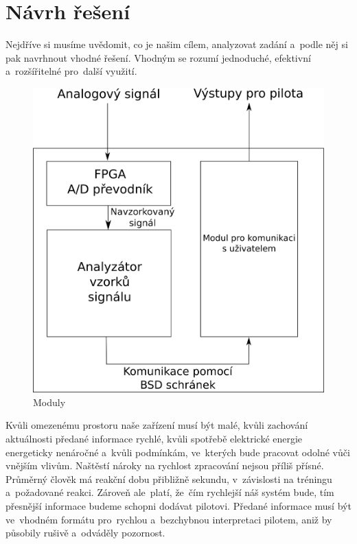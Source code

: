 \chapter{Návrh řešení}\label{navrhReseni}
	Nejdříve si musíme uvědomit, co je našim cílem, analyzovat zadání a~podle něj si pak navrhnout vhodné řešení. Vhodným se rozumí jednoduché, efektivní a~rozšířitelné pro~další využití.\par
	
	\begin{figure}[H]
		\begin{center}
			\includegraphics[scale=0.7]{obrazky-figures/navrh_obecne.png}
			\caption{Moduly}
			\label{navrh::moduly}
		\end{center}
	\end{figure}
	
	Kvůli omezenému prostoru naše zařízení musí být malé, kvůli zachování aktuálnosti předané informace rychlé, kvůli spotřebě elektrické energie energeticky nenáročné a~kvůli podmínkám, ve~kterých bude pracovat odolné vůči vnějším vlivům. Naštěstí nároky na rychlost zpracování nejsou příliš přísné. Průměrný člověk má reakční dobu přibližně sekundu, v~závislosti na tréningu a~požadované reakci. Zároveň ale~platí, že~čím rychlejší náš systém bude, tím přesnější informace budeme schopni dodávat pilotovi. Předané informace musí být ve~vhodném formátu pro~rychlou a~bezchybnou interpretaci pilotem, aniž by působily rušivě a~odváděly pozornost.
	
